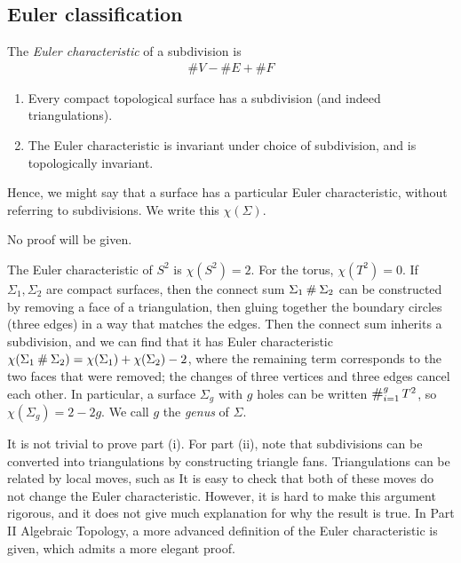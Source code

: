 \subsection{Euler classification}
\begin{definition}
	The \textit{Euler characteristic} of a subdivision is
	\begin{align*}
		\# V - \# E + \# F
	\end{align*}
\end{definition}
\begin{theorem}
	\begin{enumerate}
		\item Every compact topological surface has a subdivision (and indeed triangulations).
		\item The Euler characteristic is invariant under choice of subdivision, and is topologically invariant.
	\end{enumerate}
	Hence, we might say that a surface has a particular Euler characteristic, without referring to subdivisions.
	We write this $\chi(\Sigma)$.
\end{theorem}
No proof will be given.
\begin{example}
	The Euler characteristic of $S^2$ is $\chi(S^2) = 2$.
	For the torus, $\chi(T^2) = 0$.
	If $\Sigma_1, \Sigma_2$ are compact surfaces, then the connect sum $\Sigma_1 \mathbin{\#} \Sigma_2$ can be constructed by removing a face of a triangulation, then gluing together the boundary circles (three edges) in a way that matches the edges.
	Then the connect sum inherits a subdivision, and we can find that it has Euler characteristic $\chi(\Sigma_1 \mathbin{\#} \Sigma_2) = \chi(\Sigma_1) + \chi(\Sigma_2) - 2$, where the remaining term corresponds to the two faces that were removed; the changes of three vertices and three edges cancel each other.
	In particular, a surface $\Sigma_g$ with $g$ holes can be written $\bigconnect_{i=1}^g T^2$, so $\chi(\Sigma_g) = 2 - 2g$.
	We call $g$ the \textit{genus} of $\Sigma$.
\end{example}
\begin{remark}
	It is not trivial to prove part (i).
	For part (ii), note that subdivisions can be converted into triangulations by constructing triangle fans.
	Triangulations can be related by local moves, such as
	It is easy to check that both of these moves do not change the Euler characteristic.
	However, it is hard to make this argument rigorous, and it does not give much explanation for why the result is true.
	In Part II Algebraic Topology, a more advanced definition of the Euler characteristic is given, which admits a more elegant proof.
\end{remark}
